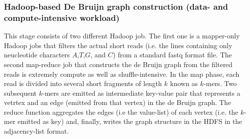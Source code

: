 \documentclass[conference]{IEEEtran}
\begin{document}
\subsubsection {Hadoop-based De Bruijn graph construction (data- and compute-intensive workload)}
This stage consists of two different Hadoop job.
The first one is a mapper-only Hadoop jobs that filters the actual short reads (i.e. the lines containing only neucleotide characters $A$,$T$,$G$, and $C$) from a standard fastq format file.
The second map-reduce job that constructs the de Bruijn graph from the filtered reads is extremely compute as well as shuffle-intensive.
In the map phase, each read is divided into several short fragments of length $k$ known as $k$-mers. 
Two subsequent $k$-mers are emitted as intermediate key-value pair that represents  a vetrtex and an edge (emitted from that vertex) in the de Bruijn graph.  
The reduce function aggregates the edges (i.e the value-list) of each vertex (i.e. the $k$-mer emitted as key) and, finally, writes the graph structure in the HDFS in the adjacency-list format.
\end{document}
